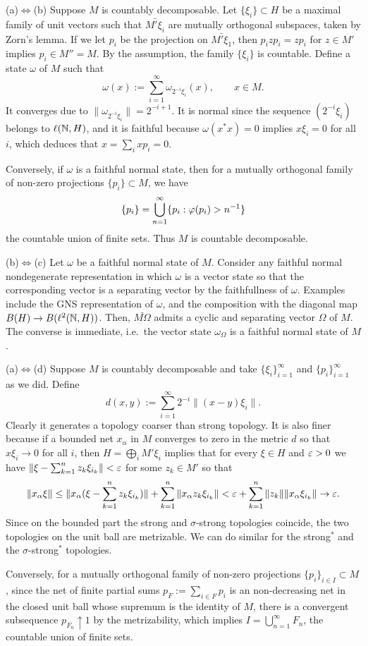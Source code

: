 \documentclass{../../../small}
\begin{document}
\begin{pf}
(a)$\Leftrightarrow$(b)
Suppose $M$ is countably decomposable.
Let $\{\xi_i\}\subset H$ be a maximal family of unit vectors such that $\bar{M'\xi_i}$ are mutually orthogonal subspaces, taken by Zorn's lemma.
If we let $p_i$ be the projection on $\bar{M'\xi_1}$, then $p_izp_i=zp_i$ for $z\in M'$ implies $p_i\in M''=M$.
By the assumption, the family $\{\xi_i\}$ is countable.
Define a state $\omega$ of $M$ such that
\[\omega(x):=\sum_{i=1}^\infty\omega_{2^{-i}\xi_i}(x),\qquad x\in M.\]
It converges due to $\|\omega_{2^{-i}\xi_i}\|=2^{-i+1}$.
It is normal since the sequence $(2^{-i}\xi_i)$ belongs to $\ell(\mathbb{N},H)$, and it is faithful because $\omega(x^*x)=0$ implies $x\xi_i=0$ for all $i$, which deduces that $x=\sum_ixp_i=0$.

Conversely, if $\omega$ is a faithful normal state, then for a mutually orthogonal family of non-zero projections $\{p_i\}\subset M$, we have
\[\{p_i\}=\bigcup_{n=1}^\infty\{p_i:\varphi(p_i)>n^{-1}\}\]
the countable union of finite sets.
Thus $M$ is countable decomposable.

(b)$\Leftrightarrow$(c)
Let $\omega$ be a faithful normal state of $M$.
Consider any faithful normal nondegenerate representation in which $\omega$ is a vector state so that the corresponding vector is a separating vector by the faithfullness of $\omega$.
Examples include the GNS representation of $\omega$, and the composition with the diagonal map $B(H)\to B(\ell^2(\mathbb{N},H))$.
Then, $\bar{M\Omega}$ admits a cyclic and separating vector $\Omega$ of $M$.
The converse is immediate, i.e.~the vector state $\omega_\Omega$ is a faithful normal state of $M$.

(a)$\Leftrightarrow$(d)
Suppose $M$ is countably decomposable and take $\{\xi_i\}_{i=1}^\infty$ and $\{p_i\}_{i=1}^\infty$ as we did.
Define
\[d(x,y):=\sum_{i=1}^\infty2^{-i}\|(x-y)\xi_i\|.\]
Clearly it generates a topology coarser than strong topology.
It is also finer because if a bounded net $x_\alpha$ in $M$ converges to zero in the metric $d$ so that $x\xi_i\to0$ for all $i$, then $H=\bigoplus_iM'\xi_i$ implies that for every $\xi\in H$ and $\varepsilon>0$ we have $\|\xi-\sum_{k=1}^nz_k\xi_{i_k}\|<\varepsilon$ for some $z_k\in M'$ so that
\[\|x_\alpha\xi\|\le\|x_\alpha(\xi-\sum_{k=1}^nz_k\xi_{i_k})\|+\sum_{k=1}^n\|x_\alpha z_k\xi_{i_k}\|<\varepsilon+\sum_{k=1}^n\|z_k\|\|x_\alpha\xi_{i_k}\|\to\varepsilon.\]
Since on the bounded part the strong and $\sigma$-strong topologies coincide, the two topologies on the unit ball are metrizable.
We can do similar for the strong$^*$ and the $\sigma$-strong$^*$ topologies.

Conversely, for a mutually orthogonal family of non-zero projections $\{p_i\}_{i\in I}\subset M$, since the net of finite partial sums $p_F:=\sum_{i\in F}p_i$ is an non-decreasing net in the closed unit ball whose supremum is the identity of $M$, there is a convergent subsequence $p_{F_n}\uparrow1$ by the metrizability, which implies $I=\bigcup_{n=1}^\infty F_n$, the countable union of finite sets.
\end{pf}
\end{document}
